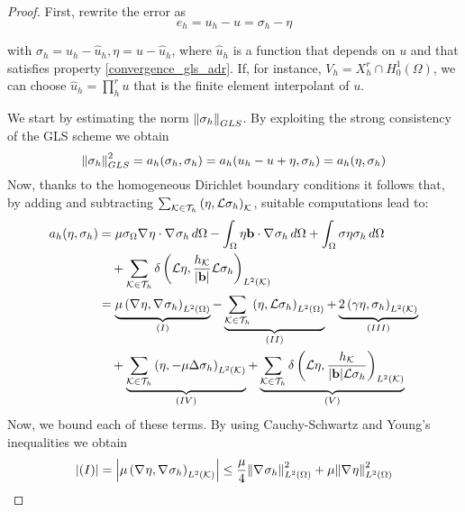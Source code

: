 \begin{proof}
    First, rewrite the error as 
    \begin{equation}
        e_h = u_h - u = \sigma_h - \eta
        \label{error_rewrite_adr}
    \end{equation}
    
    with \(\sigma_h = u_h - \hat{u}_h, \eta = u - \hat{u}_h\), where \(\hat{u}_h\) is a function that depends on \(u\) and that satisfies property \eqref{convergence_gls_adr}. If, for instance, \(V_h = X_h^r \cap H^1_0(\Omega)\), we can choose \(\hat{u}_h = \prod_{h}^{r} u\) that is the finite element interpolant of \(u\). 

    We start by estimating the norm \(\norm{\sigma_h}_{GLS}\). By exploiting the strong consistency of the GLS scheme we obtain 
    \[
        \norm{\sigma_h}^2_{GLS} = a_h(\sigma_h, \sigma_h) = a_h(u_h - u +\eta, \sigma_h) = a_h(\eta, \sigma_h)
    \]
    Now, thanks to the homogeneous Dirichlet boundary conditions it follows that, by adding and subtracting \(\sum_{{\mathcal{K}\in\mathcal{T}_h}}\left(\eta, \mathcal{L}\sigma_h\right)_{\mathcal{K}}\), suitable computations lead to:
    \begin{align*}
        a_h(\eta, \sigma_h) &= \mu \sigma_\Omega \nabla\mspace{1mu} \eta \cdot \nabla\mspace{1mu} \sigma_h \, d\Omega - \int_\Omega \eta \textbf{b} \cdot \nabla\mspace{1mu} \sigma_h \, d\Omega + \int_\Omega \sigma \eta \sigma_h \, d\Omega \\
        & \quad + \sum_{\mathcal{K}\in\mathcal{T}_h} \delta \left( \mathcal{L}\eta, \frac{h_{\mathcal{K}}}{\abs{\textbf{b}}}\mathcal{L}\sigma_h \right)_{L^2(\mathcal{K})} \\
        &= \underbrace{\mu\left( \nabla\mspace{1mu} \eta, \nabla\mspace{1mu} \sigma_h \right)_{L^2(\Omega)}}_{(I)} - \underbrace{\sum_{\mathcal{K}\in\mathcal{T}_h} \left(\eta, \mathcal{L}\sigma_h\right)_{L^2(\Omega)}}_{(II)} + \underbrace{2\left( \gamma \eta, \sigma_h \right)_{L^2(\mathcal{K})}}_{(III)} \\
        &\quad + \underbrace{\sum_{\mathcal{K}\in\mathcal{T}_h} \left( \eta, -\mu\Delta \sigma_h \right)_{L^2(\mathcal{K})}}_{(IV)} + \underbrace{\sum_{\mathcal{K}\in\mathcal{T}_h} \delta \left( \mathcal{L}\eta, \frac{h_{\mathcal{K}}}{\abs{\textbf{b}}\mathcal{L}\sigma_h} \right)_{L^2(\mathcal{K})}}_{(V)} 
    \end{align*}
    Now, we bound each of these terms. By using Cauchy-Schwartz and Young's inequalities we obtain 
    {
        \allowdisplaybreaks
        \begin{align*}
        \abs{(I)} &= \abs{\mu\left( \grad \eta, \grad \sigma_h \right)_{L^2(\element)}} \leq \frac{\mu}{4} \ltwonorm{\grad \sigma_h}^2 + \mu \ltwonorm{\grad \eta}^2 \\

\end{align*}}
\end{proof}
